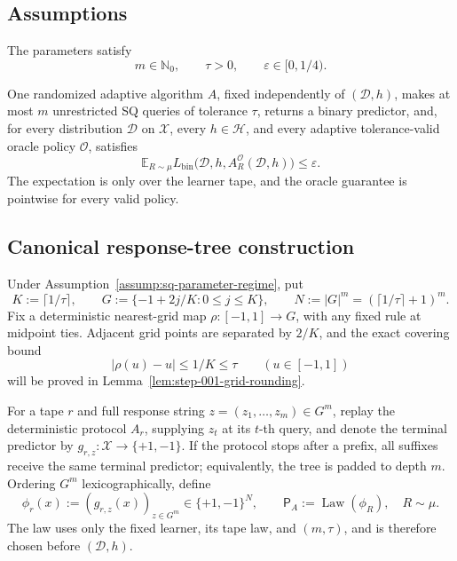 \subsection{Assumptions}

\begin{assumption}
\label{assump:sq-parameter-regime}
The parameters satisfy
\[
m\in\mathbb N_0,
\qquad
\tau>0,
\qquad
\varepsilon\in[0,1/4).
\]
\end{assumption}

\begin{assumption}
\label{assump:universal-adversarial-sq}
One randomized adaptive algorithm \(A\), fixed independently of
\((\mathcal D,h)\), makes at most \(m\) unrestricted SQ queries of
tolerance \(\tau\), returns a binary predictor, and, for every distribution
\(\mathcal D\) on \(\mathcal X\), every \(h\in\mathcal H\), and every
adaptive tolerance-valid oracle policy \(\mathcal O\), satisfies
\[
\mathbb E_{R\sim\mu}
L_{\mathrm{bin}}\bigl(
\mathcal D,h,A_R^{\mathcal O}(\mathcal D,h)
\bigr)
\le\varepsilon.
\tag{3}\label{eq:universal-sq-guarantee}
\]
The expectation is only over the learner tape, and the oracle guarantee is
pointwise for every valid policy.
\end{assumption}

\subsection{Canonical response-tree construction}

Under Assumption~\ref{assump:sq-parameter-regime}, put
\[
K:=\lceil1/\tau\rceil,
\qquad
G:=\{-1+2j/K:0\le j\le K\},
\qquad
N:=|G|^m=(\lceil1/\tau\rceil+1)^m.
\tag{4}\label{eq:grid-and-dimension}
\]
Fix a deterministic nearest-grid map \(\rho:[-1,1]\to G\), with any fixed
rule at midpoint ties.  Adjacent grid points are separated by \(2/K\), and
the exact covering bound
\[
|\rho(u)-u|\le 1/K\le\tau
\qquad(u\in[-1,1])
\tag{5}\label{eq:setup-rounding-bound}
\]
will be proved in Lemma~\ref{lem:step-001-grid-rounding}.

For a tape \(r\) and full response string
\(z=(z_1,\ldots,z_m)\in G^m\), replay the deterministic protocol \(A_r\),
supplying \(z_t\) at its \(t\)-th query, and denote the terminal predictor
by \(g_{r,z}:\mathcal X\to\{+1,-1\}\).  If the protocol stops after a
prefix, all suffixes receive the same terminal predictor; equivalently, the
tree is padded to depth \(m\).  Ordering \(G^m\) lexicographically, define
\[
\phi_r(x):=(g_{r,z}(x))_{z\in G^m}\in\{+1,-1\}^N,
\qquad
\mathsf P_A:=\operatorname{Law}(\phi_R),\quad R\sim\mu.
\tag{6}\label{eq:response-tree-map-law}
\]
The law uses only the fixed learner, its tape law, and \((m,\tau)\), and is
therefore chosen before \((\mathcal D,h)\).

